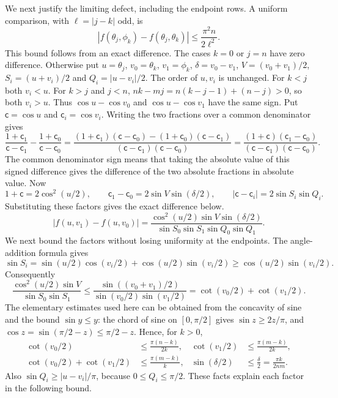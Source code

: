 We next justify the limiting defect, including the endpoint rows. A
uniform comparison, with $\ell=|j-k|$ odd, is
\begin{equation}\label{cu:deform}
 |f(\theta_j,\phi_k)-f(\theta_j,\theta_k)|
                    \leq\frac{\pi^2n}{2\ell^2}.
\end{equation}
This bound follows from an exact difference. The cases $k=0$ or $j=n$ have zero
difference. Otherwise put $u=\theta_j$, $v_0=\theta_k$, $v_1=\phi_k$,
$\delta=v_0-v_1$, $V=(v_0+v_1)/2$, $S_i=(u+v_i)/2$ and
$Q_i=|u-v_i|/2$. The order of $u,v_i$ is unchanged. For $k<j$ both $v_i<u$.
For $k>j$ and $j<n$,
$nk-mj=n(k-j-1)+(n-j)>0$, so both $v_i>u$.
Thus $\cos u-\cos v_0$ and $\cos u-\cos v_1$ have the
same sign. Put $\mathsf{c}=\cos u$ and $\mathsf{c}_i=\cos v_i$.
Writing the two fractions over a common denominator gives
\[
 \frac{1+\mathsf{c}_1}{\mathsf{c}-\mathsf{c}_1}-\frac{1+\mathsf{c}_0}{\mathsf{c}-\mathsf{c}_0}
 =\frac{(1+\mathsf{c}_1)(\mathsf{c}-\mathsf{c}_0)-(1+\mathsf{c}_0)(\mathsf{c}-\mathsf{c}_1)}
         {(\mathsf{c}-\mathsf{c}_1)(\mathsf{c}-\mathsf{c}_0)}
 =\frac{(1+\mathsf{c})(\mathsf{c}_1-\mathsf{c}_0)}{(\mathsf{c}-\mathsf{c}_1)(\mathsf{c}-\mathsf{c}_0)}.
\]
The common denominator sign means that taking the absolute value
of this signed difference gives the difference of the two absolute
fractions in absolute value. Now
\[
 1+\mathsf{c}=2\cos^2(u/2),\qquad
 \mathsf{c}_1-\mathsf{c}_0=2\sin V\sin(\delta/2),\qquad
 |\mathsf{c}-\mathsf{c}_i|=2\sin S_i\sin Q_i.
\]
Substituting these factors gives the exact difference below.
\[
 |f(u,v_1)-f(u,v_0)|=
 \frac{\cos^2(u/2)\sin V\sin(\delta/2)}
      {\sin S_0\sin S_1\sin Q_0\sin Q_1}.
\]
We next bound the factors without losing uniformity at the endpoints.
The angle-addition formula gives
\[
 \sin S_i=\sin(u/2)\cos(v_i/2)+\cos(u/2)\sin(v_i/2)
            \geq\cos(u/2)\sin(v_i/2).
\]
Consequently
\[
 \frac{\cos^2(u/2)\sin V}{\sin S_0\sin S_1}
 \leq\frac{\sin((v_0+v_1)/2)}{\sin(v_0/2)\sin(v_1/2)}
 =\cot(v_0/2)+\cot(v_1/2).
\]
The elementary estimates used here can be obtained from the concavity
of sine and the bound $\sin y\leq y$: the chord of sine on
$[0,\pi/2]$ gives $\sin z\geq2z/\pi$, and
$\cos z=\sin(\pi/2-z)\leq\pi/2-z$. Hence, for $k>0$,
\[
 \begin{aligned}
 \cot(v_0/2)&\leq\frac{\pi(n-k)}{2k},&
 \cot(v_1/2)&\leq\frac{\pi(m-k)}{2k},\\
 \cot(v_0/2)+\cot(v_1/2)&\leq\frac{\pi(m-k)}k,&
 \sin(\delta/2)&\leq\frac{\delta}{2}=\frac{\pi k}{2nm}.
 \end{aligned}
\]
Also $\sin Q_i\geq |u-v_i|/\pi$, because
$0\leq Q_i\leq\pi/2$. These facts explain each factor in the
following bound.

